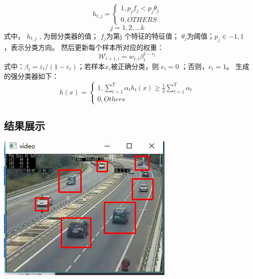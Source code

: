 \documentclass[12pt]{report}
\begin{document}
$$h_{t, j}=\left\{\begin{array}{l}{1, p_{j} f_{j}<p_{j} \theta_{j}} \\ {0, OTHERS }\end{array}\right.$$
$$j=1,2, \ldots k$$
式中， $h_{t,j}$ , 为弱分类器的值； $f_j$为第j 个特征的特征值； $\theta_j$为阈值；$ p_j∈{−1,1} $，表示分类方向。
\newline\newline
然后更新每个样本所对应的权重：$$\mathcal{W}_{t+1, i}=w_{t, i} \beta_{t}^{1-e_{i}}$$
式中：$\beta_{t}=\varepsilon_{t} /\left(1-\varepsilon_{t}\right)$；若样本$x_i$被正确分类，则 $e_i=0$ ；否则，$e_i=1$。
生成的强分类器如下：
$$h(x)=\left\{\begin{array}{l}{1, \sum_{t=1}^{T} \alpha_{t} h_{t}(x) \geq \frac{1}{2} \sum_{t=1}^{T} \alpha_{t}} \\ {0,Others}\end{array}\right.$$


\subsection{结果展示}
\includegraphics[scale=1]{20.png}
\end{document}
